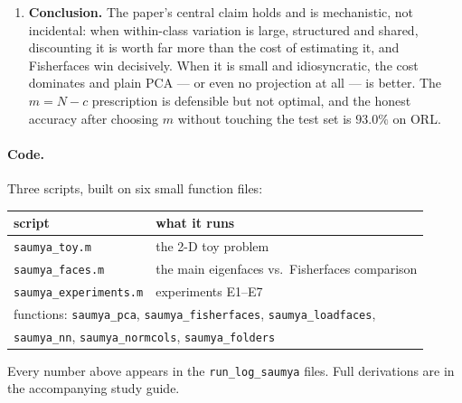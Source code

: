 \documentclass[11pt]{article}
\begin{document}
\begin{enumerate}[leftmargin=1.3em,itemsep=2pt]
\item \textbf{Conclusion.} The paper's central claim holds and is
mechanistic, not incidental: when within-class variation is large, structured
and shared, discounting it is worth far more than the cost of estimating it,
and Fisherfaces win decisively. When it is small and idiosyncratic, the cost
dominates and plain PCA --- or even no projection at all --- is better. The
$m=N-c$ prescription is defensible but not optimal, and the honest accuracy
after choosing $m$ without touching the test set is $93.0\%$ on ORL.
\end{enumerate}

\paragraph{Code.} Three scripts, built on six small function files:

\begin{center}\small
\begin{tabular}{ll}
\toprule
script & what it runs \\
\midrule
\texttt{saumya\_toy.m} & the 2-D toy problem \\
\texttt{saumya\_faces.m} & the main eigenfaces vs.\ Fisherfaces comparison \\
\texttt{saumya\_experiments.m} & experiments E1--E7 \\
\midrule
\multicolumn{2}{l}{functions: \texttt{saumya\_pca}, \texttt{saumya\_fisherfaces},
\texttt{saumya\_loadfaces},} \\
\multicolumn{2}{l}{\hphantom{functions: }\texttt{saumya\_nn},
\texttt{saumya\_normcols}, \texttt{saumya\_folders}} \\
\bottomrule
\end{tabular}
\end{center}

Every number above appears in the \texttt{run\_log\_saumya} files. Full
derivations are in the accompanying study guide.
\end{document}
